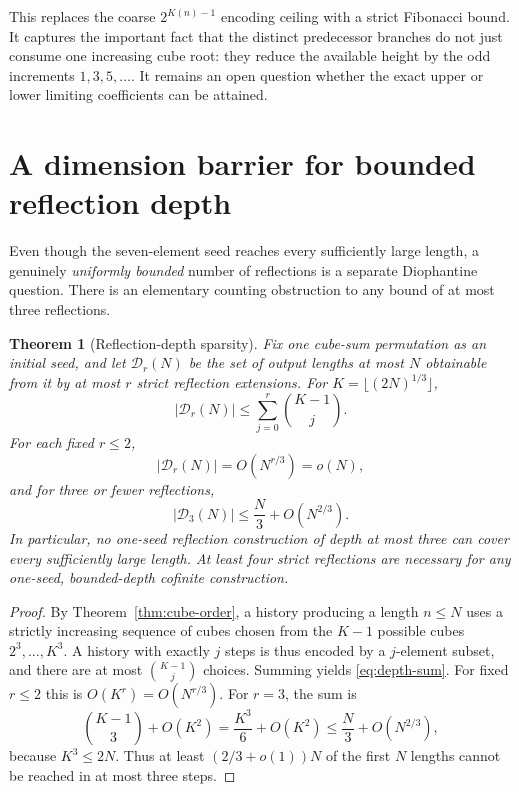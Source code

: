 \documentclass[10pt]{article}
\newtheorem{theorem}{Theorem}
\begin{document}
This replaces the coarse
$2^{K(n)-1}$ encoding ceiling
with a strict Fibonacci bound.
It captures the important fact that
the distinct predecessor branches
do not just consume one increasing
cube root: they reduce the available
height by the odd increments
$1,3,5,\ldots$.
It remains an open question whether
the exact upper or lower limiting
coefficients can be attained.

\section{A dimension barrier for bounded reflection depth}
\label{sec:depth-barrier}

Even though the seven-element seed reaches
every sufficiently large length, a genuinely
\emph{uniformly bounded} number of reflections
is a separate Diophantine question.
There is an elementary counting obstruction
to any bound of at most three reflections.

\begin{theorem}[Reflection-depth sparsity]
\label{thm:reflection-depth}
Fix one cube-sum permutation as an initial
seed, and let $\mathcal D_r(N)$ be the
set of output lengths at most $N$
obtainable from it by at most $r$
strict reflection extensions.
For $K=\lfloor(2N)^{1/3}\rfloor$,
\begin{equation}\label{eq:depth-sum}
\boxed{\displaystyle
|\mathcal D_r(N)|
\le \sum_{j=0}^{r}\binom{K-1}{j}.}
\end{equation}
For each fixed $r\le2$,
\[
\boxed{\displaystyle
|\mathcal D_r(N)|=O(N^{r/3})=o(N),}
\]
and for three or fewer reflections,
\begin{equation}\label{eq:three-depth}
\boxed{\displaystyle
|\mathcal D_3(N)|\le
\frac N3+O(N^{2/3}).}
\end{equation}
In particular, no one-seed reflection
construction of depth at most three
can cover every sufficiently large length.
At least four strict reflections are
necessary for any one-seed, bounded-depth
cofinite construction.
\end{theorem}
\begin{proof}
By Theorem~\ref{thm:cube-order}, a
history producing a length $n\le N$
uses a strictly increasing sequence
of cubes chosen from the $K-1$
possible cubes $2^3,\dots,K^3$.
A history with exactly $j$ steps
is thus encoded by a $j$-element
subset, and there are at most
$\binom{K-1}{j}$ choices.
Summing yields \eqref{eq:depth-sum}.
For fixed $r\le2$ this is
$O(K^r)=O(N^{r/3})$.
For $r=3$, the sum is
\[
\binom{K-1}{3}+O(K^2)
=\frac{K^3}{6}+O(K^2)
\le\frac N3+O(N^{2/3}),
\]
because $K^3\le2N$.
Thus at least $(2/3+o(1))N$
of the first $N$ lengths cannot be
reached in at most three steps.
\end{proof}
\end{document}
